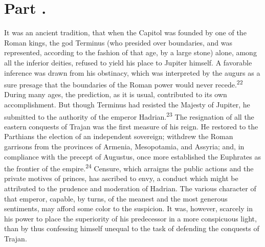 

\section{Part \thesection.}

It was an ancient tradition, that when the Capitol was founded by
one of the Roman kings, the god Terminus (who presided over
boundaries, and was represented, according to the fashion of that
age, by a large stone) alone, among all the inferior deities,
refused to yield his place to Jupiter himself. A favorable
inference was drawn from his obstinacy, which was interpreted by
the augurs as a sure presage that the boundaries of the Roman
power would never recede.\textsuperscript{22} During many ages, the prediction, as
it is usual, contributed to its own accomplishment. But though
Terminus had resisted the Majesty of Jupiter, he submitted to the
authority of the emperor Hadrian.\textsuperscript{23} The resignation of all the
eastern conquests of Trajan was the first measure of his reign.
He restored to the Parthians the election of an independent
sovereign; withdrew the Roman garrisons from the provinces of
Armenia, Mesopotamia, and Assyria; and, in compliance with the
precept of Augustus, once more established the Euphrates as the
frontier of the empire.\textsuperscript{24} Censure, which arraigns the public
actions and the private motives of princes, has ascribed to envy,
a conduct which might be attributed to the prudence and
moderation of Hadrian. The various character of that emperor,
capable, by turns, of the meanest and the most generous
sentiments, may afford some color to the suspicion. It was,
however, scarcely in his power to place the superiority of his
predecessor in a more conspicuous light, than by thus confessing
himself unequal to the task of defending the conquests of Trajan.



